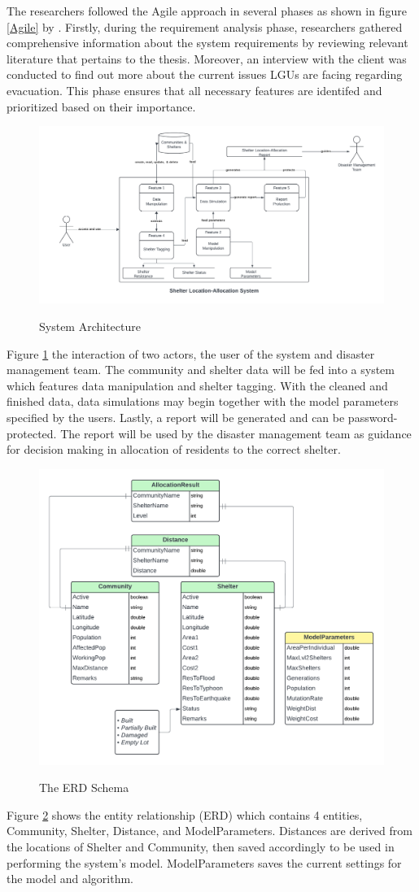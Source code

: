 \documentclass[11pt,letterpaper,]{article}
\begin{document}
	The researchers followed the Agile approach in several phases as shown in figure \ref{Agile} by \textcite{Jayathilaka2020}. Firstly, during the requirement analysis phase, researchers gathered comprehensive information about the system requirements by reviewing relevant literature that pertains to the thesis. Moreover, an interview with the client was conducted to find out more about the current issues LGUs are facing regarding evacuation. This phase ensures that all necessary features are identifed and prioritized based on their importance.
	
	\begin{figure}[h!]
		\caption{System Architecture}
		\centering
		\includegraphics[width=0.75\columnwidth]{Context Diagram}
		\label{SystemArch}
	\end{figure}
	Figure \ref{SystemArch} the interaction of two actors, the user of the system and disaster management team. The community and shelter data will be fed into a system which features data manipulation and shelter tagging. With the cleaned and finished data, data simulations may begin together with the model parameters specified by the users. Lastly, a report will be generated and can be password-protected. The report will be used by the disaster management team as guidance for decision making in allocation of residents to the correct shelter.
	
	\begin{figure}[h!]
		\caption{The ERD Schema}
		\centering
		\includegraphics[width=0.6\columnwidth]{ERD}
		\label{ERD}
	\end{figure}
	Figure \ref{ERD} shows the entity relationship (ERD) which contains 4 entities, Community, Shelter, Distance, and ModelParameters. Distances are derived from the locations of Shelter and Community, then saved accordingly to be used in performing the system’s model. ModelParameters saves the current settings for the model and algorithm.
	
\end{document}
